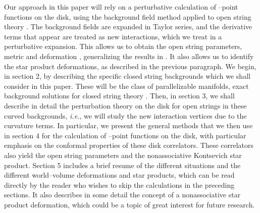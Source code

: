 \documentclass[a4paper,11pt]{article}
\begin{document}
Our approach in this paper will rely on a perturbative calculation of
\coordHE{}--point functions on the disk, using the background field method applied
to open string theory \cite{AFM, Fradkin-Tseytlin, ACNY, CLNY}. The
background fields are expanded in Taylor series, and the derivative terms
that appear are treated as new interactions, which we treat in a
perturbative expansion. This allows us to obtain the open string
parameters, metric \coordHE{} and deformation \myHighlight{$\theta$}\coordHE{}, generalizing the results
in \cite{CLNY, Schomerus, Seiberg-Witten}. It also allows us to identify
the star product deformations, as described in the previous paragraph. We
begin, in section 2, by describing the specific closed string backgrounds
which we shall consider in this paper. These will be the class of
parallelizable manifolds, exact background solutions for closed string
theory \cite{BCZ}. Then, in section 3, we shall describe in detail the
perturbation theory on the disk for open strings in these curved
backgrounds, \textit{i.e.}, we will study the new interaction vertices due
to the curvature terms. In particular, we present the general methods that
we then use in section 4 for the calculation of \coordHE{}--point functions on the
disk, with particular emphasis on the conformal properties of these disk
correlators. These correlators also yield the open string parameters and
the nonassociative Kontsevich star product. Section 5 includes a brief
resume of the different situations and the different world--volume
deformations and star products, which can be read directly by the reader
who wishes to skip the calculations in the preceding sections.  It also
describes in some detail the concept of a nonassociative star product
deformation, which could be a topic of great interest for future research.
\end{document}
